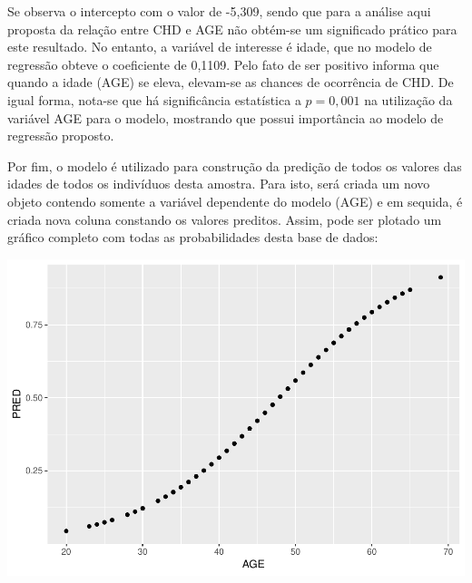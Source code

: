 \documentclass[12pt,brazil,]{book}
\newenvironment{Shaded}{\begin{snugshade}}{\end{snugshade}}
\newcommand{\CommentTok}[1]{\textcolor[rgb]{0.56,0.35,0.01}{\textit{#1}}}
\newcommand{\DataTypeTok}[1]{\textcolor[rgb]{0.13,0.29,0.53}{#1}}
\newcommand{\DecValTok}[1]{\textcolor[rgb]{0.00,0.00,0.81}{#1}}
\newcommand{\KeywordTok}[1]{\textcolor[rgb]{0.13,0.29,0.53}{\textbf{#1}}}
\newcommand{\NormalTok}[1]{#1}
\newcommand{\OperatorTok}[1]{\textcolor[rgb]{0.81,0.36,0.00}{\textbf{#1}}}
\newcommand{\StringTok}[1]{\textcolor[rgb]{0.31,0.60,0.02}{#1}}
\begin{document}
Se observa o intercepto com o valor de -5,309, sendo que para a análise
aqui proposta da relação entre CHD e AGE não obtém-se um significado
prático para este resultado. No entanto, a variável de interesse é
idade, que no modelo de regressão obteve o coeficiente de 0,1109. Pelo
fato de ser positivo informa que quando a idade (AGE) se eleva,
elevam-se as chances de ocorrência de CHD. De igual forma, nota-se que
há significância estatística a \(p=0,001\) na utilização da variável AGE
para o modelo, mostrando que possui importância ao modelo de regressão
proposto.

Por fim, o modelo é utilizado para construção da predição de todos os
valores das idades de todos os indivíduos desta amostra. Para isto, será
criada um novo objeto contendo somente a variável dependente do modelo
(AGE) e em sequida, é criada nova coluna constando os valores preditos.
Assim, pode ser plotado um gráfico completo com todas as probabilidades
desta base de dados:

\begin{Shaded}
\end{Shaded}

\includegraphics{05-RegLogist_files/figure-latex/unnamed-chunk-5-1.pdf}
\end{document}
